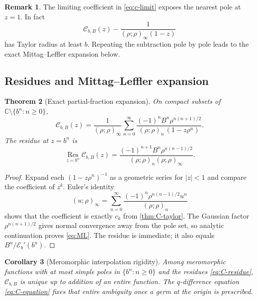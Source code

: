 \documentclass[11pt]{article}
\newtheorem{theorem}{Theorem}[section]
\newtheorem{corollary}[theorem]{Corollary}
\theoremstyle{definition}
\newtheorem{remark}[theorem]{Remark}
\newcommand{\Eker}{\mathscr{E}}
\newcommand{\Cker}{\mathscr{C}}
\newcommand{\C}{\mathbb{C}}
\newcommand{\qpf}[3]{\left(#1;#2\right)_{#3}}
\newcommand{\qpi}[2]{\left(#1;#2\right)_{\!\infty}}
\newcommand{\Res}{\operatorname*{Res}}
\begin{document}
\begin{remark}
The limiting coefficient in \eqref{eq:c-limit} exposes the nearest pole at $z=1$.  In fact
\[
 \Cker_{b,B}(z)-\frac1{\qpi{\rho}{\rho}(1-z)}
\]
has Taylor radius at least $b$.  Repeating the subtraction pole by pole leads to the exact Mittag--Leffler expansion below.
\end{remark}

\subsection{Residues and Mittag--Leffler expansion}

\begin{theorem}[Exact partial-fraction expansion]\label{thm:ML}
On compact subsets of $\C\setminus\{b^n:n\ge0\}$,
\begin{equation}\label{eq:ML}
 \boxed{\displaystyle
 \Cker_{b,B}(z)=
 \frac1{\qpi{\rho}{\rho}}
 \sum_{n=0}^{\infty}
 \frac{(-1)^nB^n\rho^{n(n+1)/2}}
      {\qpf{\rho}{\rho}{n}\,(1-z\rho^n)}.}
\end{equation}
The residue at $z=b^n$ is
\begin{equation}\label{eq:C-residue}
 \Res_{z=b^n}\Cker_{b,B}(z)
 =\frac{(-1)^{n+1}B^n\rho^{n(n-1)/2}}
       {\qpf{\rho}{\rho}{n}\qpi{\rho}{\rho}}.
\end{equation}
\end{theorem}

\begin{proof}
Expand each $(1-z\rho^n)^{-1}$ as a geometric series for $|z|<1$ and compare the coefficient of $z^k$.  Euler's identity
\[
 \qpi{u}{\rho}
 =\sum_{n=0}^{\infty}
 \frac{(-1)^n\rho^{n(n-1)/2}u^n}{\qpf{\rho}{\rho}{n}}
\]
shows that the coefficient is exactly $c_k$ from \cref{thm:C-taylor}.  The Gaussian factor $\rho^{n(n+1)/2}$ gives normal convergence away from the pole set, so analytic continuation proves \eqref{eq:ML}.  The residue is immediate; it also equals $B^n/\Eker_b'(b^n)$.
\end{proof}

\begin{corollary}[Meromorphic interpolation rigidity]\label{cor:meromorphic-rigidity}
Among meromorphic functions with at most simple poles in $\{b^n:n\ge0\}$ and the residues
\eqref{eq:C-residue}, $\Cker_{b,B}$ is unique up to addition of an entire function.  The
$q$-difference equation \eqref{eq:C-equation} fixes that entire ambiguity once a germ at the
origin is prescribed.
\end{corollary}
\end{document}
